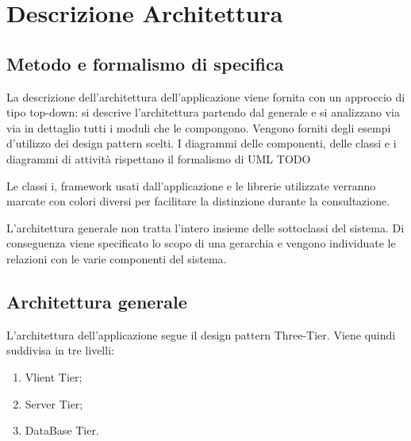%
%


\section{Descrizione Architettura} %
\label{sec:descrizione_architettura}

\subsection{Metodo e formalismo di specifica}
La descrizione dell'architettura dell'applicazione viene fornita con un approccio di tipo top-down: si descrive l'architettura partendo dal generale e si analizzano via via in dettaglio tutti i moduli che le compongono. 
Vengono forniti degli esempi d'utilizzo dei design pattern scelti.
I diagrammi delle componenti, delle classi e i diagrammi di attività rispettano il formalismo di UML
TODO

Le classi i, framework usati dall'applicazione e le librerie utilizzate verranno marcate con colori diversi per facilitare la distinzione durante la consultazione.

L’architettura generale non tratta l’intero insieme delle sottoclassi del sistema. Di
conseguenza viene specificato lo scopo di una gerarchia e vengono individuate le relazioni con
le varie componenti del sistema. 


\subsection{Architettura generale}
L’architettura dell'applicazione segue il design pattern Three-Tier. Viene quindi suddivisa
in tre livelli:
\begin{enumerate}
\item Vlient Tier;
\item Server Tier;
\item DataBase Tier.
\end{enumerate}

